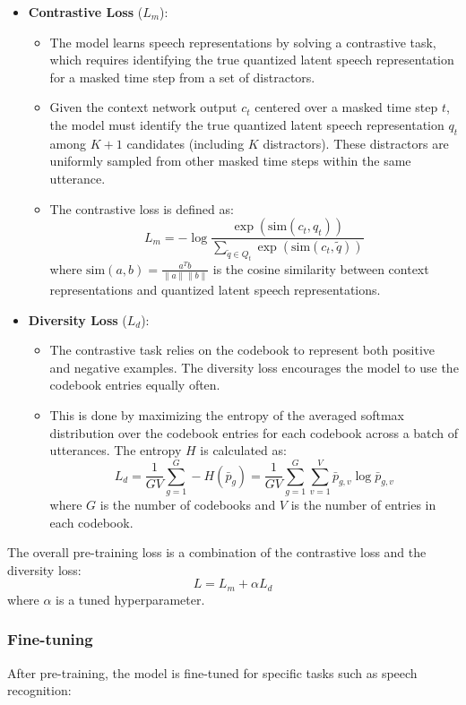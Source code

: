 \documentclass{article}
\begin{document}
\begin{itemize}
  \item \textbf{Contrastive Loss} ($L_m$):
    \begin{itemize}
      \item The model learns speech representations by solving a contrastive task, which requires identifying the true quantized latent speech representation for a masked time step from a set of distractors.
      \item Given the context network output \( c_t \) centered over a masked time step \( t \), the model must identify the true quantized latent speech representation \( q_t \) among \( K + 1 \) candidates (including \( K \) distractors). These distractors are uniformly sampled from other masked time steps within the same utterance.
      \item The contrastive loss is defined as:
      \[
      L_m = -\log \frac{\exp(\text{sim}(c_t, q_t))}{\sum_{\tilde{q} \in Q_t} \exp(\text{sim}(c_t, \tilde{q}))}
      \]
      where \(\text{sim}(a, b) = \frac{a^T b}{\|a\| \|b\|}\) is the cosine similarity between context representations and quantized latent speech representations.
    \end{itemize}

  \pagebreak

  \item \textbf{Diversity Loss} ($L_d$):
    \begin{itemize}
      \item The contrastive task relies on the codebook to represent both positive and negative examples. The diversity loss encourages the model to use the codebook entries equally often.
      \item This is done by maximizing the entropy of the averaged softmax distribution over the codebook entries for each codebook across a batch of utterances. The entropy \( H \) is calculated as:
      \[
      L_d = \frac{1}{GV} \sum_{g=1}^G -H(\bar{p}_g) = \frac{1}{GV} \sum_{g=1}^G \sum_{v=1}^V \bar{p}_{g,v} \log \bar{p}_{g,v}
      \]
      where \( G \) is the number of codebooks and \( V \) is the number of entries in each codebook.
    \end{itemize}
\end{itemize}

The overall pre-training loss is a combination of the contrastive loss and the diversity loss:
\[
L = L_m + \alpha L_d
\]
where \( \alpha \) is a tuned hyperparameter.

\subsubsection{Fine-tuning}
After pre-training, the model is fine-tuned for specific tasks such as speech recognition:
\end{document}
